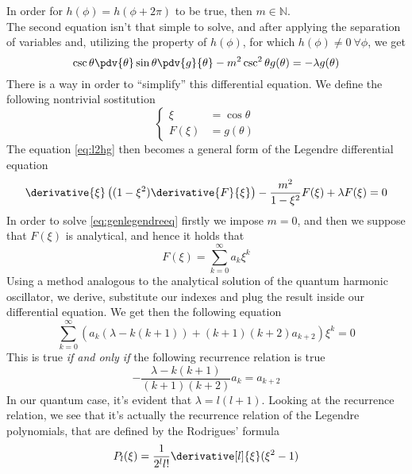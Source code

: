 \documentclass[a4paper, 11pt]{book}
\newcommand{\1}{\opr{\mathds{1}}}
\theoremstyle{plain}
\begin{document}
	In order for $h(\phi)=h(\phi+2\pi)$ to be true, then $m\in\mathbb{N}$.\\
	The second equation isn't that simple to solve, and after applying the separation of variables and, utilizing the property of $h(\phi)$, for which $h(\phi)\ne0\ \forall\phi$, we get
	\begin{equation}
		\csc{\theta}\pdv{\theta}\sin\theta\pdv{g}{\theta}-m^2\csc^2\theta g(\theta)=-\lambda g(\theta)
		\label{eq:l2hg}
	\end{equation}
	There is a way in order to ``simplify'' this differential equation. We define the following nontrivial sostitution
	\begin{equation*}
		\left\{
		\begin{aligned}
			\xi&=\cos\theta\\
			F(\xi)&=g(\theta)
		\end{aligned}
	\right.
	\end{equation*}
	The equation \eqref{eq:l2hg} then becomes a general form of the Legendre differential equation
	\begin{equation}
		\derivative{\xi}\left( (1-\xi^2)\derivative{F}{\xi} \right)-\frac{m^2}{1-\xi^2}F(\xi)+\lambda F(\xi)=0
		\label{eq:genlegendreeq}
	\end{equation}
	In order to solve \eqref{eq:genlegendreeq} firstly we impose $m=0$, and then we suppose that $F(\xi)$ is analytical, and hence it holds that
	\begin{equation*}
		F(\xi)=\sum_{k=0}^{\infty}a_k\xi^k
	\end{equation*}
	Using a method analogous to the analytical solution of the quantum harmonic oscillator, we derive, substitute our indexes and plug the result inside our differential equation. We get then the following equation
	\begin{equation}
		\sum_{k=0}^{\infty}\left( a_k(\lambda-k(k+1))+(k+1)(k+2)a_{k+2} \right)\xi^k=0
		\label{eq:sphharmseries}
	\end{equation}
	This is true \emph{if and only if} the following recurrence relation is true
	\begin{equation}
		-\frac{\lambda-k(k+1)}{(k+1)(k+2)}a_k=a_{k+2}
		\label{eq:recrel}
	\end{equation}
	In our quantum case, it's evident that $\lambda=l(l+1)$. Looking at the recurrence relation, we see that it's actually the recurrence relation of the Legendre polynomials, that are defined by the Rodrigues' formula
	\begin{equation}
		P_l(\xi)=\frac{1}{2^ll!}\derivative[l]{\xi}(\xi^2-1)
		\label{eq:rodrigueslpol}
	\end{equation}
\end{document}
